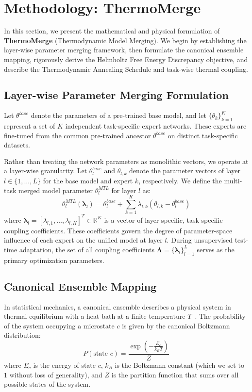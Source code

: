 \section{Methodology: ThermoMerge}
\label{sec:method}

In this section, we present the mathematical and physical formulation of \textbf{ThermoMerge} (Thermodynamic Model Merging). We begin by establishing the layer-wise parameter merging framework, then formulate the canonical ensemble mapping, rigorously derive the Helmholtz Free Energy Discrepancy objective, and describe the Thermodynamic Annealing Schedule and task-wise thermal coupling.

\subsection{Layer-wise Parameter Merging Formulation}
Let $\theta^{base}$ denote the parameters of a pre-trained base model, and let $\{\theta_k\}_{k=1}^K$ represent a set of $K$ independent task-specific expert networks. These experts are fine-tuned from the common pre-trained ancestor $\theta^{base}$ on distinct task-specific datasets. 

Rather than treating the network parameters as monolithic vectors, we operate at a layer-wise granularity. Let $\theta_l^{base}$ and $\theta_{l,k}$ denote the parameter vectors of layer $l \in \{1, \dots, L\}$ for the base model and expert $k$, respectively. We define the multi-task merged model parameter $\theta_l^{MTL}$ for layer $l$ as:
\begin{equation}
\label{eq:merging_param}
\theta_l^{MTL}(\boldsymbol{\lambda}_l) = \theta_l^{base} + \sum_{k=1}^K \lambda_{l,k} \left( \theta_{l,k} - \theta_l^{base} \right)
\end{equation}
where $\boldsymbol{\lambda}_l = [\lambda_{l,1}, \dots, \lambda_{l,K}]^T \in \mathbb{R}^K$ is a vector of layer-specific, task-specific coupling coefficients. These coefficients govern the degree of parameter-space influence of each expert on the unified model at layer $l$. During unsupervised test-time adaptation, the set of all coupling coefficients $\boldsymbol{\Lambda} = \{\boldsymbol{\lambda}_l\}_{l=1}^L$ serves as the primary optimization parameters.

\subsection{Canonical Ensemble Mapping}
In statistical mechanics, a canonical ensemble describes a physical system in thermal equilibrium with a heat bath at a finite temperature $T$~\cite{gibbs1902elementary}. The probability of the system occupying a microstate $c$ is given by the canonical Boltzmann distribution:
\begin{equation}
P(\text{state } c) = \frac{\exp\left( - \frac{E_c}{k_B T} \right)}{Z}
\end{equation}
where $E_c$ is the energy of state $c$, $k_B$ is the Boltzmann constant (which we set to $1$ without loss of generality), and $Z$ is the partition function that sums over all possible states of the system.

